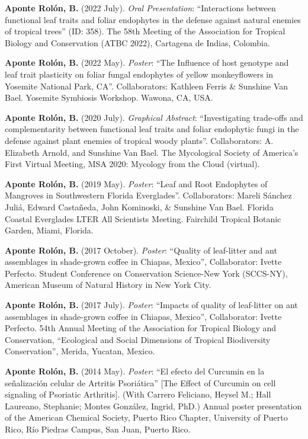 \documentclass[11pt,a4paper,]{awesome-cv}
\begin{document}
\textbf{Aponte Rolón, B.} (2022 July). \emph{Oral Presentation}:
``Interactions between functional leaf traits and foliar endophytes in
the defense against natural enemies of tropical trees'' (ID: 358). The
58th Meeting of the Association for Tropical Biology and Conservation
(ATBC 2022), Cartagena de Indias, Colombia.

\textbf{Aponte Rolón, B.} (2022 May). \emph{Poster}: ``The Influence of
host genotype and leaf trait plasticity on foliar fungal endophytes of
yellow monkeyflowers in Yosemite National Park, CA''. Collaborators:
Kathleen Ferris \& Sunshine Van Bael. Yosemite Symbiosis Workshop.
Wawona, CA, USA.

\textbf{Aponte Rolón, B.} (2020 July). \emph{Graphical Abstract}:
``Investigating trade-offs and complementarity between functional leaf
traits and foliar endophytic fungi in the defense against plant enemies
of tropical woody plants''. Collaborators: A. Elizabeth Arnold, and
Sunshine Van Bael. The Mycological Society of America's First Virtual
Meeting, MSA 2020: Mycology from the Cloud (virtual).

\textbf{Aponte Rolón, B.} (2019 May). \emph{Poster}: ``Leaf and Root
Endophytes of Mangroves in Southwestern Florida Everglades''.
Collaborators: Mareli Sánchez Juliá, Edward Castañeda, John Kominoski,
\& Sunshine Van Bael. Florida Coastal Everglades LTER All Scientists
Meeting. Fairchild Tropical Botanic Garden, Miami, Florida.

\textbf{Aponte Rolón, B.} (2017 October). \emph{Poster}: ``Quality of
leaf-litter and ant assemblages in shade-grown coffee in Chiapas,
Mexico'', Collaborator: Ivette Perfecto. Student Conference on
Conservation Science-New York (SCCS-NY), American Museum of Natural
History in New York City.

\textbf{Aponte Rolón, B.} (2017 July). \emph{Poster}: ``Impacts of
quality of leaf-litter on ant assemblages in shade-grown coffee in
Chiapas, Mexico'', Collaborator: Ivette Perfecto. 54th Annual Meeting of
the Association for Tropical Biology and Conservation, ``Ecological and
Social Dimensions of Tropical Biodiversity Conservation'', Merida,
Yucatan, Mexico.

\textbf{Aponte Rolón, B.} (2014 May). \emph{Poster}: ``El efecto del
Curcumin en la señalización celular de Artritis Psoriática'' {[}The
Effect of Curcumin on cell signaling of Psoriatic Arthritis{]}. (With
Carrero Feliciano, Heysel M.; Hall Laureano, Stephanie; Montes González,
Ingrid, PhD.) Annual poster presentation of the American Chemical
Society, Puerto Rico Chapter, University of Puerto Rico, Río Piedras
Campus, San Juan, Puerto Rico.
\end{document}
